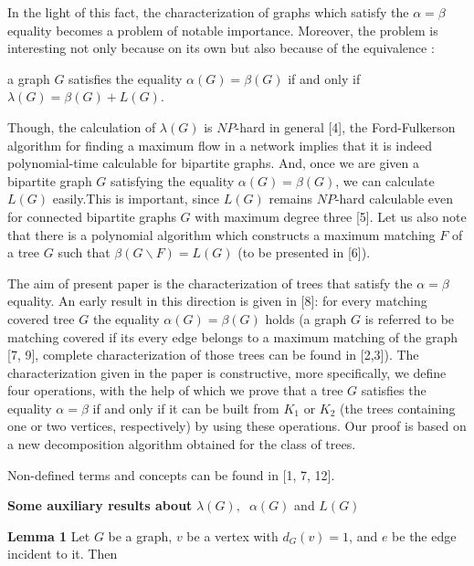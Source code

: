 \documentclass{article}
\begin{document}
In the light of this fact, the characterization of graphs which satisfy the $\alpha =\beta $ equality becomes a problem of notable importance. Moreover,
the problem is interesting not only because on its own but also because of
the equivalence :

\begin{center}
a graph $G$ satisfies the equality $\alpha (G)=\beta (G)$ if and only if $\lambda (G)=\beta (G)+L(G)$.
\end{center}

Though, the calculation of $\lambda (G)$ is $NP$-hard in general [4], the
Ford-Fulkerson algorithm for finding a maximum flow in a network implies
that it is indeed polynomial-time calculable for bipartite graphs. And, once
we are given a bipartite graph $G$ satisfying the equality $\alpha (G)=\beta
(G)$, we can calculate $L(G)$ easily.This is important, since $L(G)$ remains 
$NP$-hard calculable even for connected bipartite graphs $G$ with maximum
degree three [5]. Let us also note that there is a polynomial algorithm
which constructs a maximum matching $F$ of a tree $G$ such that $\beta
(G\backslash F)=L(G)$ (to be presented in [6]).

The aim of present paper is the characterization of trees that satisfy the $\alpha =\beta $ equality. An early result in this direction is given in [8]:
for every matching covered tree $G$ the equality $\alpha (G)=\beta (G)$
holds (a graph $G$ is referred to be matching covered if its every edge
belongs to a maximum matching of the graph [7, 9], complete characterization
of those trees can be found in [2,3]). The characterization given in the
paper is constructive, more specifically, we define four operations, with
the help of which we prove that a tree $G$ satisfies the equality $\alpha
=\beta $ if and only if it can be built from $K_{1}$ or $K_{2}$ (the trees
containing one or two vertices, respectively) by using these operations. Our
proof is based on a new decomposition algorithm obtained for the class of
trees.

Non-defined terms and concepts can be found in [1, 7, 12].

\bigskip

\begin{center}
\textbf{Some auxiliary results about }$\lambda (G),$\textbf{\ }$\alpha (G)$
and $L(G)$
\end{center}

\bigskip

\textbf{Lemma 1} Let $G$ be a graph, $v$ be a vertex with $d_{G}(v)=1$, and $e$ be the edge incident to it. Then
\end{document}
